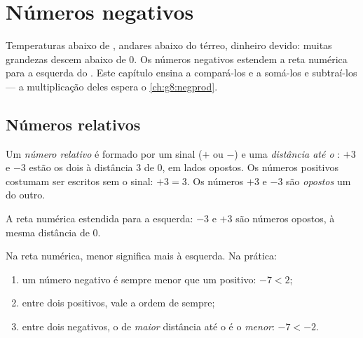 \chapter{Números negativos}\label{ch:g7:negatives}

Temperaturas abaixo de , andares abaixo do térreo, dinheiro devido:
muitas grandezas descem abaixo de $0$. Os números negativos estendem a
reta numérica para a esquerda do . Este capítulo ensina a
compará-los e a somá-los e subtraí-los --- a multiplicação deles espera
o \cref{ch:g8:negprod}.

\section{Números relativos}

\begin{definition}\label{def:g7:negatives:def}
Um \emph{número relativo} é formado por um sinal
($+$ ou $-$) e uma \emph{distância até o }: $+3$ e $-3$ estão os
dois à distância $3$ de $0$, em lados opostos. Os números positivos
costumam ser escritos sem o sinal: $+3 = 3$. Os números $+3$ e $-3$ são
\emph{opostos} um do outro.
\end{definition}

\begin{omfigure}

{\small A reta numérica estendida para a esquerda: $-3$ e $+3$ são
números opostos, à mesma distância de $0$.}
\end{omfigure}

\begin{method}\label{met:g7:negatives:compare}
Na reta numérica, menor significa mais à esquerda. Na prática:
\begin{enumerate}
  \item um número negativo é sempre menor que um positivo: $-7 < 2$;
  \item entre dois positivos, vale a ordem de sempre;
  \item entre dois negativos, o de \emph{maior} distância até o  é
        o \emph{menor}: $-7 < -2$.
\end{enumerate}
\end{method}

